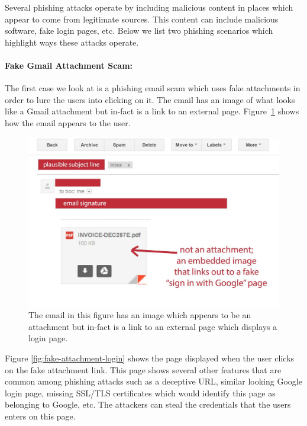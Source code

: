 Several phishing attacks operate by including malicious content in places which appear to come from legitimate sources. This content can include malicious software, fake login pages, etc. Below we list two phishing scenarios which highlight ways these attacks operate.

\paragraph{Fake Gmail Attachment Scam: }
The first case we look at is a phishing email scam \cite{fake-attachment-scam} which uses fake attachments in order to lure the users into clicking on it. The email has an image of what looks like a Gmail attachment but in-fact is a link to an external page. Figure~\ref{fig:fake-attachment} shows how the email appears to the user.

\begin{figure}[p]
\centering
    \includegraphics[width=1.0\textwidth]{tomscott-gmail-phishing.jpg}
    \caption{The email in this figure has an image which appears to be an attachment but in-fact is a link to an external page which displays a login page.}
   \label{fig:fake-attachment}
\end{figure}

Figure \ref{fig:fake-attachment-login} shows the page displayed when the user clicks on the fake attachment link. This page shows several other features that are common among phishing attacks such as a deceptive URL, similar looking Google login page, missing SSL/TLS certificates which would identify this page as belonging to Google, etc. The attackers can steal the credentials that the users enters on this page.

